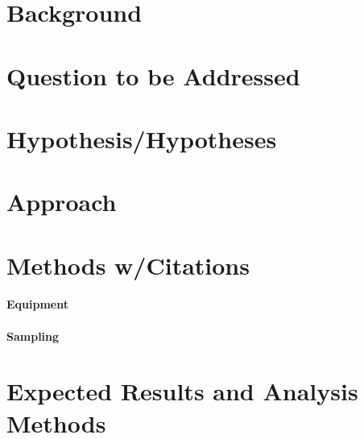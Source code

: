 \documentclass{tufte-handout}
\begin{document}
\section{Background}

\section{Question to be Addressed}

\section{Hypothesis/Hypotheses}

\section{Approach}

 

\section{Methods w/Citations}

\paragraph{Equipment}

\paragraph{Sampling}


\section{Expected Results and Analysis Methods}
\end{document}
